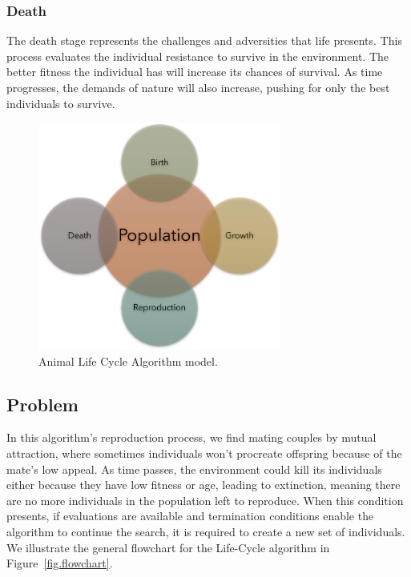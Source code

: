 \documentclass[graybox]{svmult}
\begin{document}
\subsubsection{Death} The death stage represents the challenges and adversities
that life presents. This process evaluates the individual resistance to survive
in the environment. The better fitness the individual has will increase its
chances of survival. As time progresses, the demands of nature will also
increase, pushing for only the best individuals to survive.

\begin{figure}
    \centering
    \includegraphics[width=80mm]{img/fig_algorithm_model.pdf}
    \caption{Animal Life Cycle Algorithm model.} \label{fig.algorithm_model}
    \end{figure}

\subsection{Problem}

In this algorithm's reproduction process, we find mating couples by mutual
attraction, where sometimes individuals won't procreate offspring because of
the mate's low appeal. As time passes, the environment could kill its
individuals either because they have low fitness or age, leading to extinction,
meaning there are no more individuals in the population left to reproduce. When
this condition presents, if evaluations are available and termination
conditions enable the algorithm to continue the search, it is required to
create a new set of individuals. We illustrate the general flowchart for the
Life-Cycle algorithm in Figure~\ref{fig.flowchart}.
\end{document}
